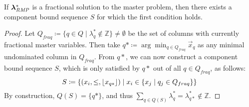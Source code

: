 \begin{proposition}
If ${\bm{\lambda}}^*_{\textit{RMP}}{}$ is a fractional solution to the master problem, then there exists a component bound sequence $S$ for which the first condition holds.
\end{proposition}

\begin{proof}\label{pr:cg_bp_bp}
Let $Q_{fraq} \coloneqq \{ q \in Q \mid \lambda_q^* \not\in \mathbb{Z} \} \neq \emptyset$ be the set of columns with currently fractional master variables. Then take $q* \coloneqq \arg\min_{q \in Q_{fraq}} \vec{x}_q$ as any minimal undominated column in $Q_{fraq}$.
From $q*$, we can now construct a component bound sequence $S$, which is only satisfied by $q*$ out of all $q \in Q_{fraq}$, as follows:
\begin{equation}
S \coloneqq \left\{ \left( x_i, \leq, \lfloor x_{q*}\rfloor \right) \mid x_i \in \{x_j \mid q_j \in Q_{fraq}\} \right\}
\end{equation}
By construction, $Q(S) = \{q*\}$, and thus $\sum_{q \in Q(S)} \lambda_q^* = \lambda_{q*}^* \not\in \mathbb{Z}$.
\end{proof}

